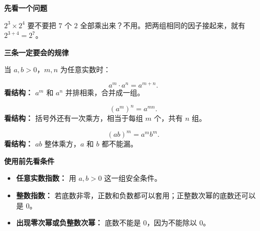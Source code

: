 \begin{statementbox}
    \textbf{\textcolor{CStatement}{先看一个问题}}\par
    $2^3\times2^4$ 要不要把 $7$ 个 $2$ 全部乘出来？不用。把两组相同的因子接起来，就有 $2^{3+4}=2^7$。

    \medskip
    \begin{center}
    
    \end{center}

    \textbf{\textcolor{CStatement}{三条一定要会的规律}}\par
    当 $a,b>0$，$m,n$ 为任意实数时：
    \begin{description}[style=nextline,leftmargin=2.5em,itemsep=0.45em]
        \item[\textbf{一、 同底数幂相乘：指数相加。}]
        \[a^m\cdot a^n=a^{m+n}.\]
        \textbf{看结构：} $a^m$ 和 $a^n$ 并排相乘，合并成一组。
        \item[\textbf{二、 幂的乘方：指数相乘。}]
        \[(a^m)^n=a^{mn}.\]
        \textbf{看结构：} 括号外还有一次乘方，相当于每组 $m$ 个，共有 $n$ 组。
        \item[\textbf{三、 积的乘方：每个因子都要乘方。}]
        \[(ab)^m=a^mb^m.\]
        \textbf{看结构：} $ab$ 整体乘方，$a$ 和 $b$ 都不能漏。
    \end{description}

    \textbf{\textcolor{CStatement}{使用前先看条件}}\par
    \begin{itemize}[leftmargin=*,itemsep=0.25em,topsep=0.3em]
        \item \textbf{任意实数指数：} 用 $a,b>0$ 这一组安全条件。
        \item \textbf{整数指数：} 若底数非零，正数和负数都可以套用；正整数次幂的底数还可以是 $0$。
        \item \textbf{出现零次幂或负整数次幂：} 底数不能是 $0$，因为不能除以 $0$。
    \end{itemize}
\end{statementbox}
